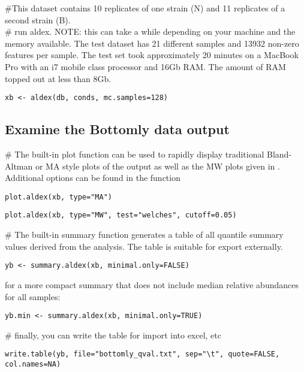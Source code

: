 \documentclass[11pt]{article}
\begin{document}
\noindent\#This dataset contains 10 replicates of one strain (N) and 11 replicates of a second strain (B).\\

\noindent \#  run aldex. NOTE: this can take a while depending on your machine and the memory available. The test dataset  has 21 different samples and  13932 non-zero features per sample. The test set took approximately 20 minutes on a MacBook Pro with an i7 mobile class processor and 16Gb RAM. The amount of RAM topped out at less than 8Gb.  \\

\begin{verbatim}xb <- aldex(db, conds, mc.samples=128)
\end{verbatim}

\subsection{Examine the Bottomly data output}
\noindent\#  The built-in plot function can be used to rapidly display traditional Bland-Altman or MA style plots of the output as well as the MW plots given in \cite{fernandes:2013}. Additional options can be found in the function\\
\noindent\begin{verbatim}plot.aldex(xb, type="MA")\end{verbatim}
\noindent\begin{verbatim}plot.aldex(xb, type="MW", test="welches", cutoff=0.05)
\end{verbatim}

\noindent\#  The built-in summary function generates a table of all quantile summary values derived from the analysis. The table is suitable for export externally. \\

\noindent\begin{verbatim}yb <- summary.aldex(xb, minimal.only=FALSE)\end{verbatim}
for a more compact summary that does not include median relative abundances for all samples:\\
\noindent\begin{verbatim}yb.min <- summary.aldex(xb, minimal.only=TRUE)\end{verbatim}

\noindent\# finally, you can write the table for import into excel, etc\\
\begin{verbatim}write.table(yb, file="bottomly_qval.txt", sep="\t", quote=FALSE, col.names=NA)\end{verbatim}
\end{document}
